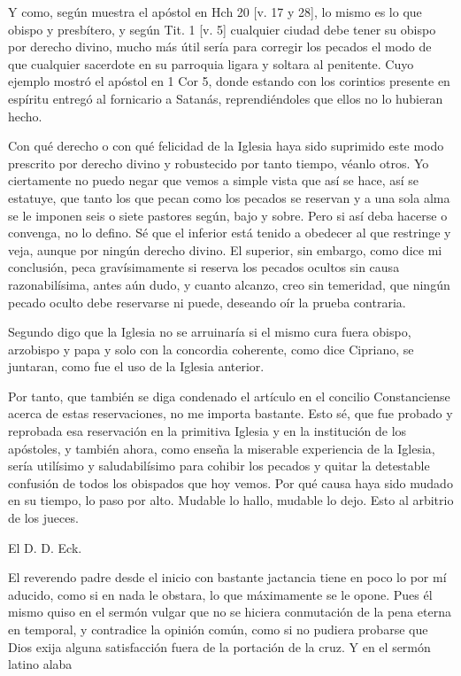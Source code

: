 Y como, según muestra el apóstol en Hch 20 [v. 17 y 28], lo mismo es lo que obispo y presbítero, y según Tit. 1 [v. 5] cualquier ciudad debe tener su obispo por derecho divino, mucho más útil sería para corregir los pecados el modo de que cualquier sacerdote en su parroquia ligara y soltara al penitente. Cuyo ejemplo mostró el apóstol en 1 Cor 5, donde estando con los corintios presente en espíritu entregó al fornicario a Satanás, reprendiéndoles que ellos no lo hubieran hecho.

Con qué derecho o con qué felicidad de la Iglesia haya sido suprimido este modo prescrito por derecho divino y robustecido por tanto tiempo, véanlo otros. Yo ciertamente no puedo negar que vemos a simple vista que así se hace, así se estatuye, que tanto los que pecan como los pecados se reservan y a una sola alma se le imponen seis o siete pastores según, bajo y sobre. Pero si así deba hacerse o convenga, no lo defino. Sé que el inferior está tenido a obedecer al que restringe y veja, aunque por ningún derecho divino. El superior, sin embargo, como dice mi conclusión, peca gravísimamente si reserva los pecados ocultos sin causa razonabilísima, antes aún dudo, y cuanto alcanzo, creo sin temeridad, que ningún pecado oculto debe reservarse ni puede, deseando oír la prueba contraria.

Segundo digo que la Iglesia no se arruinaría si el mismo cura fuera obispo, arzobispo y papa y solo con la concordia coherente, como dice Cipriano, se juntaran, como fue el uso de la Iglesia anterior.

Por tanto, que también se diga condenado el artículo en el concilio Constanciense acerca de estas reservaciones, no me importa bastante. Esto sé, que fue probado y reprobada esa reservación en la primitiva Iglesia y en la institución de los apóstoles, y también ahora, como enseña la miserable experiencia de la Iglesia, sería utilísimo y saludabilísimo para cohibir los pecados y quitar la detestable confusión de todos los obispados que hoy vemos. Por qué causa haya sido mudado en su tiempo, lo paso por alto. Mudable lo hallo, mudable lo dejo. Esto al arbitrio de los jueces.

\marginpar{\small[380]} El D. D. Eck.

El reverendo padre desde el inicio con bastante jactancia tiene en poco lo por mí aducido, como si en nada le obstara, lo que máximamente se le opone. Pues él mismo quiso en el sermón vulgar que no se hiciera conmutación de la pena eterna en temporal, y contradice la opinión común, como si no pudiera probarse que Dios exija alguna satisfacción fuera de la portación de la cruz. Y en el sermón latino alaba

